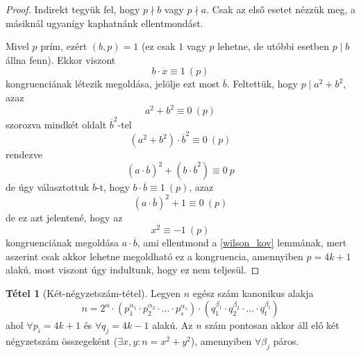 \documentclass[12pt]{book}
\theoremstyle{plain} %
\theoremstyle{definition} %
\newtheorem{theo/}{Tétel}[section]
\newenvironment{theo}
  {\renewcommand{\qedsymbol}{$\clubsuit$}%
   \pushQED{\qed}\begin{theo/}}
  {\popQED\end{theo/}}
\theoremstyle{remark}
\renewcommand\qedsymbol{$\blacksquare$}
\numberwithin{equation}{section}  %
\begin{document}
	\begin{proof}
		Indirekt tegyük fel, hogy $p \nmid b$ vagy $p \nmid a$. Csak az első esetet nézzük meg, a másiknál ugyanígy kaphatnánk ellentmondást.
		
		Mivel $p$ prím, ezért $(b,p)=1$ (ez csak $1$ vagy $p$ lehetne, de utóbbi esetben $p\mid b$ állna fenn). Ekkor viszont
		\[ b\cdot x \equiv 1\ (p)  \]
		kongruenciának létezik megoldása, jelölje ezt most $\overline{b}$. Feltettük, hogy $p\mid a^2+b^2$, azaz
		\[ a^2+b^2\equiv 0\ (p) \]
		szorozva mindkét oldalt $\overline{b}^2$-tel
		\[ (a^2+b^2)\cdot \overline{b}^2 \equiv 0\ (p) \]
		rendezve
		\[ (a\cdot \overline{b})^2 + (b\cdot \overline{b}^2 ) \equiv 0\ p  \]
		de úgy választottuk $\overline{b}$-t, hogy $b\cdot \overline{b} \equiv 1\ (p)$, azaz
		\[ (a\cdot \overline{b})^2 + 1 \equiv 0\ (p)  \]
		de ez azt jelentené, hogy az
		\[ x^2 \equiv -1\ (p)  \]
		kongruenciának megoldása $a\cdot \overline{b}$, ami ellentmond a \ref{wilson_kov} lemmának, mert aszerint csak akkor lehetne megoldható ez a kongruencia, amennyiben $p=4k+1$ alakú, most viszont úgy indultunk, hogy ez nem teljesül.
	\end{proof}
	
	\begin{theo}[Két-négyzetszám-tétel]\label{knszt}
		Legyen $n$ egész szám kanonikus alakja
		\[ n = 2^{\alpha} \cdot (p_1^{\alpha_1} \cdot p_2^{\alpha_2} \cdot \ldots \cdot p_s^{\alpha_s} ) \cdot (q_1^{\beta_1} \cdot q_2^{\beta_2} \cdot \ldots \cdot q_t^{\beta_t})  \]
		ahol $\forall p_i = 4k+1$ és $\forall q_j = 4k-1$ alakú.
		Az $n$ szám pontosan akkor áll elő két négyzetszám összegeként ($\exists x,y\colon n = x^2 + y^2$), amennyiben $\forall \beta_j$ páros.
	\end{theo}
\end{document}
